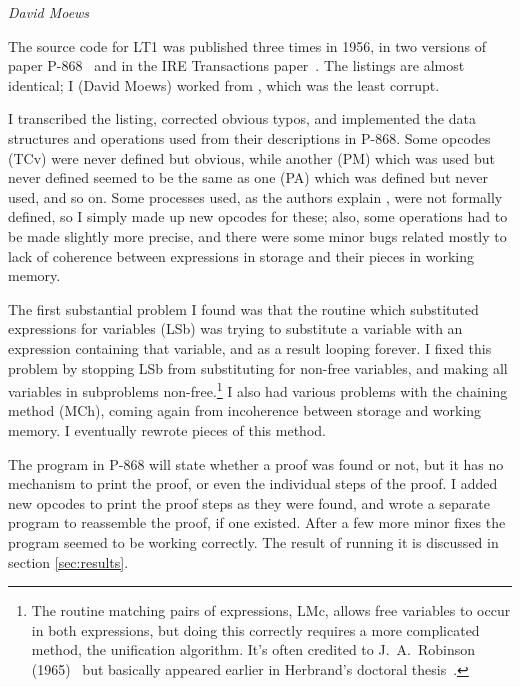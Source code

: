 \documentclass[journal]{IEEEtran}
\begin{document}
%
%


{\em David Moews}

The source code for LT1 was published three times in 1956, in two
versions of paper P-868~\cite{LT1956a,LT1956b} and in the 
IRE Transactions paper~\cite{LT1956c}.  The listings are almost identical; I
(David Moews) worked from \cite{LT1956b}, which was the least corrupt.

I transcribed the listing, corrected obvious typos, and
implemented the data structures and operations used from their
descriptions in P-868.  Some opcodes (TCv) were never defined
but obvious, while another (PM) which was used but never defined
seemed to be the same as one (PA) which was defined but never
used, and so on.  Some processes used, as the authors explain
\cite[p.~50]{LT1956b}, were not formally defined, so I simply
made up new opcodes for these; also, some operations had to
be made slightly more precise, and there were some minor bugs
related mostly to lack of coherence between expressions in
storage and their pieces in working memory.  

The first substantial problem I found was that the routine 
which substituted expressions for variables (LSb)
was trying to substitute a variable with an expression
containing that variable, and as a result looping forever.  
I fixed this problem by stopping LSb from substituting
for non-free variables, and making all variables in subproblems
non-free.\footnote{The routine matching pairs of expressions, LMc, allows
free variables to occur in both expressions, but doing this correctly 
requires a more complicated method, the unification algorithm.  It's 
often credited to J.~A.~Robinson (1965)~\cite{robinson1965} but basically
appeared earlier in Herbrand's doctoral thesis~\cite[Section~18]{lecherbrand2009}.}
I also had various problems with the chaining method (MCh),
coming again from incoherence between storage and working
memory.  I eventually rewrote pieces of this method.

The program in P-868 will state whether a proof was found or not,
but it has no mechanism to print the proof, or even the individual
steps of the proof.  I added new opcodes to print the proof steps
as they were found, and wrote a separate program to reassemble the 
proof, if one existed.  After a few more minor fixes the program seemed 
to be working correctly.  The result of running it is discussed in section
\ref{sec:results}.
\end{document}
